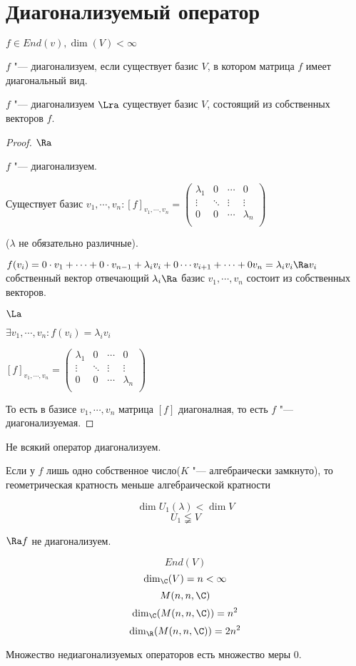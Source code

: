 \section{Диагонализуемый оператор}
\begin{Def}
$f \in End(v), \dim(V) < \infty$

$f$ "--- диагонализуем, если существует базис $V$, в котором
матрица $f$ имеет диагональный вид. 
\end{Def}

\begin{theorem}{}
$f$ "--- диагонализуем $\Lra$ существует базис $V$, состоящий из собственных
векторов $f$.
\end{theorem}
\begin{proof}
$\Ra$ 

$f$ "--- диагонализуем.

Существует базис $v_1, \cdots, v_n \colon [f]_{v_1, \cdots, v_n} = 
\begin{pmatrix}
\lambda_1&0&\cdots&0\\
\vdots&\ddots&\vdots&\vdots\\
0&0&\cdots&\lambda_n\\
\end{pmatrix}$

($\lambda$ не обязательно различные).

$f(v_i) = 0\cdot v_1 + \cdots + 0\cdot v_{n - 1} + \lambda_i v_i + 0\cdots v_{i + 1} +  \cdots + 0v_{n} = \lambda_i v_i \Ra
v_i$ собственный вектор отвечающий $\lambda_i \Ra$ базис $v_1, \cdots, v_n$ состоит из собственных векторов.

$\La$

$\exists v_1, \cdots, v_n \colon f(v_i) = \lambda_i v_i$

$[f]_{v_1, \cdots, v_n} = 
\begin{pmatrix}
\lambda_1&0&\cdots&0\\
\vdots&\ddots&\vdots&\vdots\\
0&0&\cdots&\lambda_n\\
\end{pmatrix}$

То есть в базисе $v_1, \cdots, v_n$ матрица $[f]$ диагоналная, то есть $f$ "--- диагонализуемая.
\end{proof}

\begin{Rem}
Не всякий оператор диагонализуем.

Если у $f$ лишь одно собственное число($K$ "--- алгебраически замкнуто), то геометрическая кратность меньше алгебраической кратности

$$\dim U_1(\lambda) < \dim V$$
$$U_1 \lneqq V$$

$\Ra f$ не диагонализуем.

$$End(V)$$
$$\dim_{\C}(V) = n < \infty$$
$$M(n, n, \C)$$
$$\dim_{\C}(M(n, n, \C)) = n^2$$
$$\dim_{\R}(M(n, n, \C)) = 2n^2$$

Множество недиагонализуемых операторов есть множество меры 0.
\end{Rem}